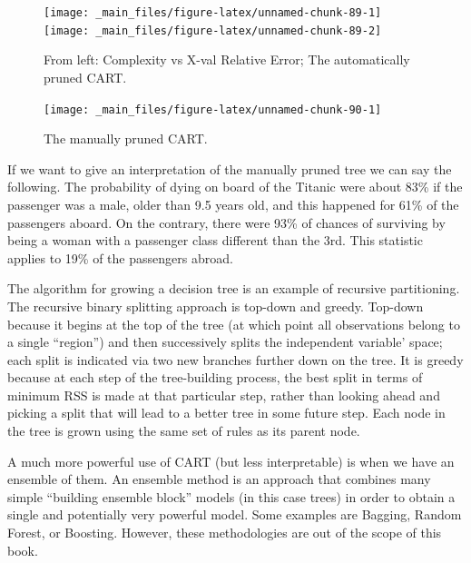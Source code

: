 \documentclass[
]{svmono}
\begin{document}
\begin{figure}[H]
\texttt{[image: \_main\_files/figure-latex/unnamed-chunk-89-1]} \texttt{[image: \_main\_files/figure-latex/unnamed-chunk-89-2]} \caption{From left: Complexity vs X-val Relative Error; The automatically pruned CART.}\label{fig:unnamed-chunk-89}
\end{figure}

\begin{figure}[H]

{\centering \texttt{[image: \_main\_files/figure-latex/unnamed-chunk-90-1]} 

}

\caption{The manually pruned CART.}\label{fig:unnamed-chunk-90}
\end{figure}

If we want to give an interpretation of the manually pruned tree we can
say the following. The probability of dying on board of the Titanic were
about 83\% if the passenger was a male, older than 9.5 years old, and
this happened for 61\% of the passengers aboard. On the contrary, there
were 93\% of chances of surviving by being a woman with a passenger class
different than the 3rd. This statistic applies to 19\% of the passengers
abroad.

The algorithm for growing a decision tree is an example of recursive
partitioning. The recursive binary splitting approach is top-down and
greedy. Top-down because it begins at the top of the tree (at which
point all observations belong to a single ``region'') and then
successively splits the independent variable' space; each split is
indicated via two new branches further down on the tree. It is greedy
because at each step of the tree-building process, the best split in
terms of minimum RSS is made at that particular step, rather than
looking ahead and picking a split that will lead to a better tree in
some future step. Each node in the tree is grown using the same set of
rules as its parent node.

A much more powerful use of CART (but less interpretable) is when we
have an ensemble of them. An ensemble method is an approach that
combines many simple ``building ensemble block'' models (in this case
trees) in order to obtain a single and potentially very powerful model.
Some examples are Bagging, Random Forest, or Boosting. However, these
methodologies are out of the scope of this book.

~

~

~
\end{document}
